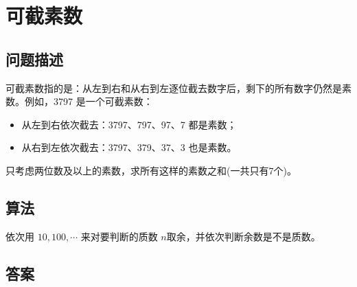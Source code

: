 \section{可截素数}
\subsection{问题描述}
\begin{tcolorbox}

可截素数指的是：从左到右和从右到左逐位截去数字后，剩下的所有数字仍然是素数。例如，3797 是一个可截素数：

\begin{itemize}
    \item 从左到右依次截去：3797、797、97、7 都是素数；
    \item 从右到左依次截去：3797、379、37、3 也是素数。
\end{itemize}

只考虑两位数及以上的素数，求所有这样的素数之和(一共只有7个)。

\end{tcolorbox}

\subsection{算法}

依次用 \( 10, 100, \cdots \) 来对要判断的质数 \( n \)取余，并依次判断余数是不是质数。

\subsection{答案}
